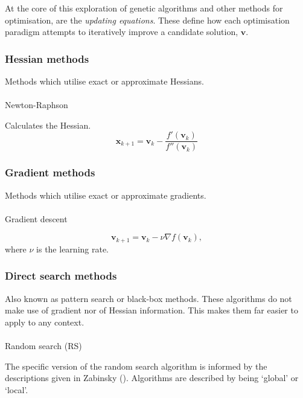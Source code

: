 \documentclass[
  a4paper,
  DIV=11,
  numbers=noendperiod]{scrartcl}
\makeatletter
\let\oldparagraph\paragraph
\renewcommand{\paragraph}{
    \@ifstar
      \xxxParagraphStar
      \xxxParagraphNoStar
  }
\newcommand{\xxxParagraphStar}[1]{\oldparagraph*{#1}\mbox{}}
\newcommand{\xxxParagraphNoStar}[1]{\oldparagraph{#1}\mbox{}}
\newcommand{\B}[1]{\boldsymbol{#1}}
\newcommand{\+}{\phantom{-}}
\makeatother
\begin{document}
At the core of this exploration of genetic algorithms and other methods
for optimisation, are the \emph{updating equations}. These define how
each optimisation paradigm attempts to iteratively improve a candidate
solution, \(\B v\).

\subsubsection{Hessian methods}\label{hessian-methods}

Methods which utilise exact or approximate Hessians.

\paragraph{Newton-Raphson}\label{newton-raphson}

Calculates the Hessian.
\[\B x_{k+1} = \B v_k -\frac{f'\left(\B v_k\right)}{f''\left(\B v_k\right)}\]

\subsubsection{Gradient methods}\label{gradient-methods}

Methods which utilise exact or approximate gradients.

\paragraph{Gradient descent}\label{gradient-descent}

\[\B v_{k+1} = \B v_k -\nu \nabla f\left( \B v_k \right),\] where
\(\nu\) is the learning rate.

\subsubsection{Direct search methods}\label{direct-search-methods}

Also known as pattern search or black-box methods. These algorithms do
not make use of gradient nor of Hessian information. This makes them far
easier to apply to any context.

\paragraph{Random search (RS)}\label{random-search-rs}

The specific version of the random search algorithm is informed by the
descriptions given in Zabinsky ().
Algorithms are described by being `global' or `local'.
\end{document}
